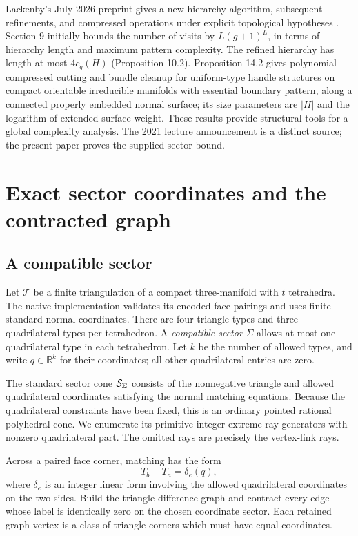\documentclass[11pt,letterpaper]{article}
\theoremstyle{definition}
\theoremstyle{remark}\newtheorem{remark}[theorem]{Remark}
\newcommand{\R}{\mathbb R}\newcommand{\Q}{\mathbb Q}
\begin{document}
Lackenby's July 2026 preprint gives a new hierarchy algorithm, subsequent
refinements, and compressed operations under explicit topological hypotheses
\cite{lackenby2026}. Section 9 initially bounds the number of visits by
$L(g+1)^L$, in terms of hierarchy length and maximum pattern complexity.
The refined hierarchy has length at most $4c_q(H)$
(Proposition 10.2). Proposition 14.2 gives polynomial compressed cutting
and bundle cleanup for uniform-type handle structures on compact
orientable irreducible manifolds with essential boundary pattern, along
a connected properly embedded normal surface; its size parameters are
$|H|$ and the logarithm of extended surface weight. These results provide
structural tools for a global complexity analysis. The 2021 lecture
announcement is a distinct source\cite{lackenbytalk}; the present paper
proves the supplied-sector bound.

\section{Exact sector coordinates and the contracted graph}
\label{sec:model}

\subsection{A compatible sector}

Let $\mathcal T$ be a finite triangulation of a compact three-manifold with
$t$ tetrahedra. The native implementation validates its encoded face
pairings and uses finite standard normal coordinates. There are four
triangle types and three quadrilateral types per tetrahedron. A
\emph{compatible sector} $\Sigma$ allows at most one quadrilateral type
in each tetrahedron. Let $k$ be the number of allowed types, and write
$q\in\R^k$ for their coordinates; all other quadrilateral entries are zero.

The standard sector cone $\mathcal S_\Sigma$ consists of the nonnegative
triangle and allowed quadrilateral coordinates satisfying the normal
matching equations. Because the quadrilateral constraints have been fixed,
this is an ordinary pointed rational polyhedral cone. We enumerate its
primitive integer extreme-ray generators with nonzero quadrilateral part.
The omitted rays are precisely the vertex-link rays.

Across a paired face corner, matching has the form
\begin{equation}
 T_b-T_a=\delta_e(q),
 \label{eq:difference}
\end{equation}
where $\delta_e$ is an integer linear form involving the allowed
quadrilateral coordinates on the two sides. Build the triangle difference
graph and contract every edge whose label is identically zero on the
chosen coordinate sector. Each retained graph vertex is a class of triangle
corners which must have equal coordinates.
\end{document}
